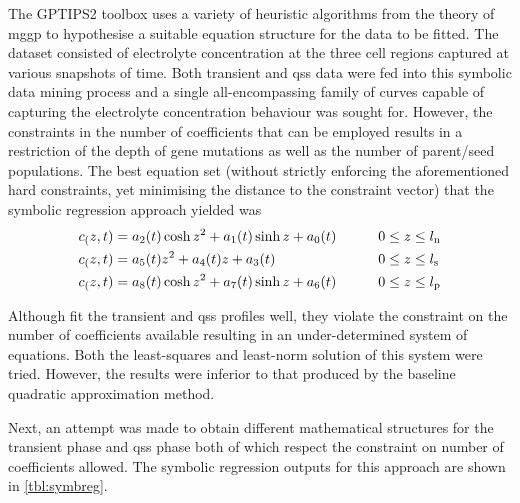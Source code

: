 The GPTIPS2  toolbox uses a variety  of heuristic algorithms from  the theory of
\gls{mggp}  to hypothesise  a suitable  equation structure  for the  data to  be
fitted.  The dataset  consisted of  %
electrolyte  concentration  at the  three cell  regions captured  at various
snapshots  of time.  Both transient and  \gls{qss} data  were  fed into  this
symbolic data  mining  process and  a single all-encompassing  family of curves
capable of capturing  the electrolyte concentration behaviour was  sought for.
However, the constraints  in the number of coefficients that  can be employed
results  in a restriction of  the depth of gene  mutations as  well  as the
number of  parent/seed  populations. The  best equation set  (without strictly
enforcing the aforementioned  hard constraints, yet  minimising  the  distance
to  the constraint  vector)  that  the  symbolic regression approach yielded was
\begin{alignat}{2}
    c_\ensub(z,t) & = a_2(t) \cosh z^2 + a_1(t) \sinh z + a_0(t) \qquad &  & 0
    \le z \le l_\text{n} \label{eq:cnstrviolneg} \\
    c_\essub(z,t) & = a_5(t) z^2 + a_4(t) z + a_3(t) \qquad             &  & 0 \le z \le l_\text{s}                         \\
    c_\epsub(z,t) & = a_8(t) \cosh z^2 + a_7(t) \sinh z + a_6(t) \qquad &  & 0 \le z \le l_\text{p}\label{eq:cnstrviolpos}
\end{alignat}

Although   fit   the  transient  and
\gls{qss}  profiles  well,  they  violate   the  constraint  on  the  number  of
coefficients  available resulting  in  an under-determined  system of  equations.
Both  the least-squares  and  least-norm  solution of  this  system were  tried.
However, the  results were inferior to  that produced by the  baseline quadratic
approximation method.

Next, an  attempt was made to  obtain different mathematical structures  for the
transient phase  and \gls{qss}  phase both  of which  respect the  constraint on
number  of  coefficients  allowed.  The symbolic  regression  outputs  for  this
approach are shown in \cref{tbl:symbreg}.


